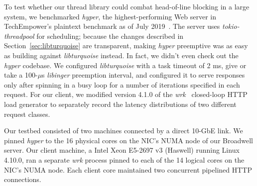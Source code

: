 To test whether our thread library could combat head-of-line blocking in a large
system, we benchmarked
\textit{hyper}, the highest-performing Web server in TechEmpower's plaintext
benchmark as of July 2019~\cite{www-hyper}.  The server uses
\textit{tokio-threadpool} for scheduling; because the changes described in
Section~\ref{sec:libturquoise} are transparent, making \textit{hyper} preemptive was
as easy as building against \textit{libturquoise} instead.  In fact, we didn't even
check out the \textit{hyper} codebase.  We configured \textit{libturquoise} with a
task timeout of 2 ms, give or take a
100-$\mu$s \textit{libinger} preemption interval, and configured it to serve
responses only after spinning in a busy loop for a number of iterations specified in
each request.  For our client, we modified version 4.1.0 of the
\textit{wrk}~\cite{www-wrk} closed-loop HTTP load generator to separately record the
latency distributions of two different request classes.

Our testbed consisted of two machines connected by a direct 10-GbE link.  We pinned
\textit{hyper} to the 16 physical cores on the NIC's NUMA node of our Broadwell
server.  Our client machine, a Intel Xeon E5-2697 v3 (Haswell) running Linux 4.10.0,
ran a separate \textit{wrk} process pinned to each of the 14 logical cores on the
NIC's NUMA node.  Each client core maintained two concurrent pipelined HTTP
connections.


